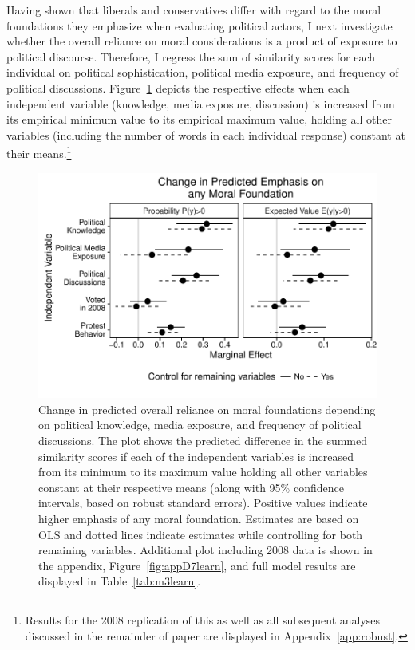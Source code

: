\documentclass[12pt]{article}
\begin{document}
Having shown that liberals and conservatives differ with regard to the moral foundations they emphasize when evaluating political actors, I next investigate whether the overall reliance on moral considerations is a product of exposure to political discourse. Therefore, I regress the sum of similarity scores for each individual on political sophistication, political media exposure, and frequency of political discussions. Figure~\ref{fig:3learn} depicts the respective effects when each independent variable (knowledge, media exposure, discussion) is increased from its empirical minimum value to its empirical maximum value, holding all other variables (including the number of words in each individual response) constant at their means.\footnote{Results for the 2008 replication of this as well as all subsequent analyses discussed in the remainder of paper are displayed in Appendix~\ref{app:robust}.}

\begin{figure}[h]\centering
\includegraphics[scale=.9]{../calc/fig/fig3learn.pdf}
\caption{Change in predicted overall reliance on moral foundations depending on political knowledge, media exposure, and frequency of political discussions. The plot shows the predicted difference in the summed similarity scores if each of the independent variables is increased from its minimum to its maximum value holding all other variables constant at their respective means (along with 95\% confidence intervals, based on robust standard errors). Positive values indicate higher emphasis of any moral foundation. Estimates are based on OLS and dotted lines indicate estimates while controlling for both remaining variables. Additional plot including 2008 data is shown in the appendix, Figure~\ref{fig:appD7learn}, and full model results are displayed in Table~\ref{tab:m3learn}.}\label{fig:3learn}
\end{figure}
\end{document}
